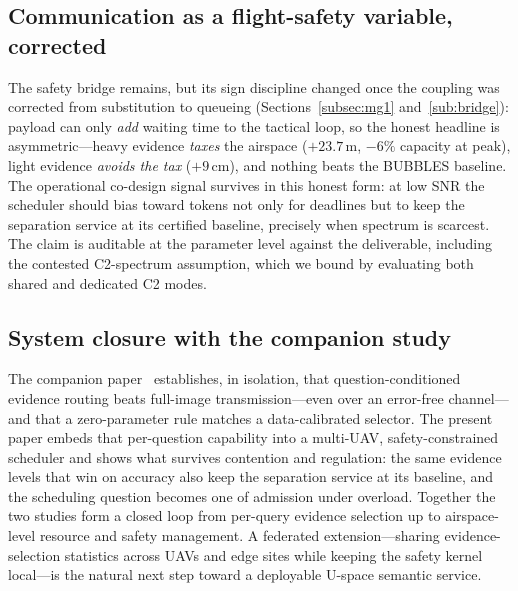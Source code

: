 \subsection{Communication as a flight-safety variable, corrected}
The safety bridge remains, but its sign discipline changed once the
coupling was corrected from substitution to queueing
(Sections~\ref{subsec:mg1} and~\ref{sub:bridge}): payload can only
\emph{add} waiting time to the tactical loop, so the honest headline is
asymmetric---heavy evidence \emph{taxes} the airspace ($+23.7$\,m,
$-6\%$ capacity at peak), light evidence \emph{avoids the tax}
($+9$\,cm), and nothing beats the BUBBLES baseline. The operational
co-design signal survives in this honest form: at low SNR the scheduler
should bias toward tokens not only for deadlines but to keep the
separation service at its certified baseline, precisely when spectrum is
scarcest. The claim is auditable at the parameter level against the
deliverable, including the contested C2-spectrum assumption, which we
bound by evaluating both shared and dedicated C2 modes.

\subsection{System closure with the companion study}
The companion paper~\cite{zhang2026askb4tx} establishes, in isolation, that
question-conditioned evidence routing beats full-image transmission---even
over an error-free channel---and that a zero-parameter rule matches a
data-calibrated selector. The present paper embeds that per-question
capability into a multi-UAV, safety-constrained scheduler and shows what
survives contention and regulation: the same evidence levels that win on
accuracy also keep the separation service at its baseline, and the
scheduling question becomes one of admission under overload. Together the
two studies form a closed loop from per-query evidence selection up to
airspace-level resource and safety management. A federated
extension---sharing evidence-selection statistics across UAVs and edge
sites while keeping the safety kernel local---is the natural next step
toward a deployable U-space semantic service.

